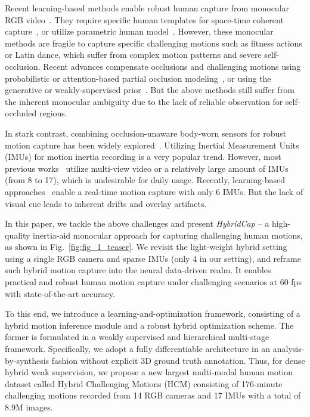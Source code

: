 \documentclass[letterpaper]{article} \usepackage{aaai23}  \usepackage{times}  \usepackage{helvet}  \usepackage{courier}  \usepackage[hyphens]{url}  \usepackage{graphicx} \urlstyle{rm} \def\UrlFont{\rm}  \usepackage{natbib}  \usepackage{caption} \frenchspacing  \setlength{\pdfpagewidth}{8.5in}  \setlength{\pdfpageheight}{11in}  \usepackage{algorithm}
\begin{document}
Recent learning-based methods enable robust human capture from monocular RGB video~\cite{Kanazawa_2019CVPR,VIBE_CVPR2020,DeepHuman_2019ICCV,Xiang_2019_CVPR}.
They require specific human templates for space-time coherent capture~\cite{LiveCap2019tog,MonoPerfCap,EventCap_CVPR2020,DeepCap_CVPR2020}, or utilize parametric human model~\cite{HMR18,AMASS_ICCV2019,SPIN_ICCV2019,VIBE_CVPR2020,SMPL2015}.
However, these monocular methods are fragile to capture specific challenging motions such as fitness actions or Latin dance, which suffer from complex motion patterns and severe self-occlusion. 
Recent advances compensate occlusions and challenging motions using probabilistic or attention-based partial occlusion modeling~\cite{PHMR_ICCV2021,PARE_ICCV2021}, or using the generative or weakly-supervised prior~\cite{HUMOR_ICCV2021,challencap}.
But the above methods still suffer from the inherent monocular ambiguity due to the lack of reliable observation for self-occluded regions.

In stark contrast, combining occlusion-unaware body-worn sensors for robust motion capture has been widely explored~\cite{henschel2020accurate,pons2011outdoor,gilbert2019fusing,zhang2020fusing,kaufmann2021pose}. 
Utilizing Inertial Measurement Units (IMUs) for motion inertia recording is a very popular trend.
However, most previous works~\cite{pons2010multisensor,pons2011outdoor,von2016human,malleson2017real,vonMarcard2018,gilbert2019fusing,malleson2019real,zhang2020fusing} utilize multi-view video or a relatively large amount of IMUs (from 8 to 17), which is undesirable for daily usage.
Recently, learning-based approaches~\cite{huang2018DIP,TransPose2021} enable a real-time motion capture with only 6 IMUs. 
But the lack of visual cue leads to inherent drifts and overlay artifacts. 


In this paper, we tackle the above challenges and present \textit{HybridCap} -- a high-quality inertia-aid monocular approach for capturing challenging human motions, as shown in Fig.~\ref{fig:fig_1_teaser}.
We revisit the light-weight hybrid setting using a single RGB camera and sparse IMUs (only 4 in our setting), and reframe such hybrid motion capture into the neural data-driven realm.
It enables practical and robust human motion capture under challenging scenarios at 60 fps with state-of-the-art accuracy.


To this end, we introduce a learning-and-optimization framework, consisting of a hybrid motion inference module and a robust hybrid optimization scheme.
The former is formulated in a weakly supervised and hierarchical multi-stage framework.
Specifically, we adopt a fully differentiable architecture in an analysis-by-synthesis fashion without explicit 3D ground truth annotation.
Thus, for dense hybrid weak supervision, we propose a new largest multi-modal human motion dataset called Hybrid Challenging Motions (HCM) consisting of 176-minute challenging motions recorded from 14 RGB cameras and 17 IMUs with a total of 8.9M images.
\end{document}
